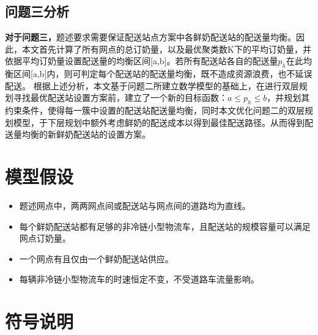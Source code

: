 \documentclass[withoutpreface,bwprint]{cumcmthesis} %
\begin{document}
	\subsection{问题三分析}
	\textbf{对于问题三，}题述要求需要保证配送站点方案中各鲜奶配送站的配送量均衡。因此，本文首先计算了所有网点的总订奶量，以及最优聚类数K下的平均订奶量，并依据平均订奶量设置配送量的均衡区间[a,b]。若所有配送站各自的配送量$p_{h}$在此均衡区间[a,b]内，则可判定每个配送站的配送量均衡，既不造成资源浪费，也不延误配送。
	根据上述分析，本文基于问题二所建立数学模型的基础上，在进行双层规划寻找最优配送站设置方案前，建立了一个新的目标函数：$a\le p_{h}\le b$，并规划其约束条件，使得每一簇中设置的配送站配送量均衡，同时本文优化问题二的双层规划模型，于下层规划中额外考虑鲜奶的配送成本以得到最佳配送路径。从而得到配送量均衡的新鲜奶配送站的设置方案。
	

	
	\section{模型假设}
	
	\begin{itemize}
		\item 题述网点中，两两网点间或配送站与网点间的道路均为直线。
		\item 每个鲜奶配送站都有足够的非冷链小型物流车，且配送站的规模容量可以满足网点订奶量。
		\item 一个网点有且仅由一个鲜奶配送站供应。
		\item 每辆非冷链小型物流车的时速恒定不变，不受道路车流量影响。
	\end{itemize}
	
	\section{符号说明}
	
\end{document}
